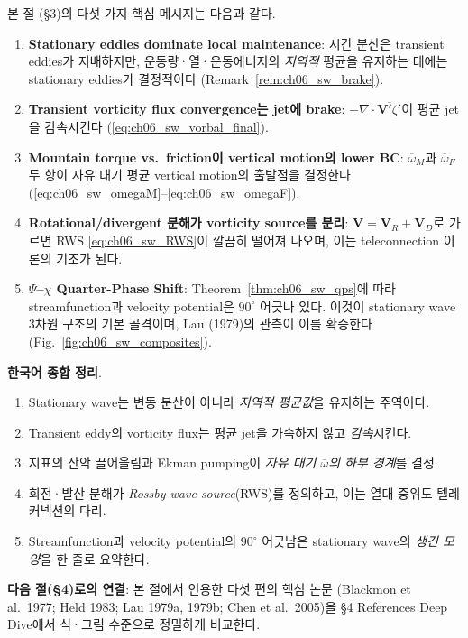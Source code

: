 \begin{remarkbox}
본 절 (§3)의 다섯 가지 핵심 메시지는 다음과 같다.
\begin{enumerate}
  \item \textbf{Stationary eddies dominate local maintenance}:
        시간 분산은 transient eddies가 지배하지만, 운동량·열·운동에너지의 \emph{지역적} 평균을
        유지하는 데에는 stationary eddies가 결정적이다 (Remark~\ref{rem:ch06_sw_brake}).
  \item \textbf{Transient vorticity flux convergence는 jet에 brake}:
        $-\nabla\!\cdot\!\overline{\mathbf{V}'\zeta'}$이 평균 jet을 감속시킨다 (\eqref{eq:ch06_sw_vorbal_final}).
  \item \textbf{Mountain torque vs.\ friction이 vertical motion의 lower BC}:
        $\overline{\omega}_M$과 $\overline{\omega}_F$ 두 항이 자유 대기 평균 vertical motion의 출발점을 결정한다
        (\eqref{eq:ch06_sw_omegaM}--\eqref{eq:ch06_sw_omegaF}).
  \item \textbf{Rotational/divergent 분해가 vorticity source를 분리}:
        $\overline{\mathbf{V}} = \overline{\mathbf{V}}_R + \overline{\mathbf{V}}_D$로 가르면 RWS \eqref{eq:ch06_sw_RWS}이
        깔끔히 떨어져 나오며, 이는 teleconnection 이론의 기초가 된다.
  \item \textbf{$\Psi$--$\chi$ Quarter-Phase Shift}:
        Theorem~\ref{thm:ch06_sw_qps}에 따라 streamfunction과 velocity potential은 $90^\circ$
        어긋나 있다.  이것이 stationary wave 3차원 구조의 기본 골격이며, Lau (1979)의 관측이
        이를 확증한다 (Fig.~\ref{fig:ch06_sw_composites}).
\end{enumerate}
\end{remarkbox}

\begin{hisublock}
\textbf{한국어 종합 정리}.
\begin{enumerate}
  \item Stationary wave는 변동 분산이 아니라 \emph{지역적 평균값}을 유지하는 주역이다.
  \item Transient eddy의 vorticity flux는 평균 jet을 가속하지 않고 \emph{감속}시킨다.
  \item 지표의 산악 끌어올림과 Ekman pumping이 \emph{자유 대기 $\overline{\omega}$의 하부 경계}를 결정.
  \item 회전·발산 분해가 \emph{Rossby wave source}(RWS)를 정의하고, 이는 열대-중위도 텔레커넥션의 다리.
  \item Streamfunction과 velocity potential의 $90^\circ$ 어긋남은 stationary wave의 \emph{생긴 모양}을 한 줄로 요약한다.
\end{enumerate}

\medskip
\textbf{다음 절(§4)로의 연결}: 본 절에서 인용한 다섯 편의 핵심 논문
(Blackmon et al.\ 1977; Held 1983; Lau 1979a, 1979b; Chen et al.\ 2005)을
§4 References Deep Dive에서 식·그림 수준으로 정밀하게 비교한다.
\end{hisublock}

